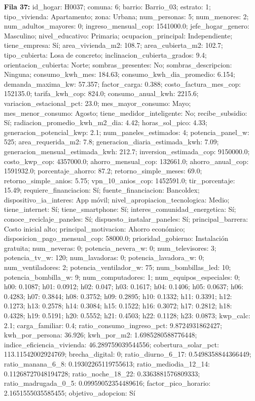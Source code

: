 {\footnotesize\textbf{Fila 37:} id\_hogar: H0037; comuna: 6; barrio: Barrio\_03; estrato: 1; tipo\_vivienda: Apartamento; zona: Urbana; num\_personas: 5; num\_menores: 2; num\_adultos\_mayores: 0; ingreso\_mensual\_cop: 1541000.0; jefe\_hogar\_genero: Masculino; nivel\_educativo: Primaria; ocupacion\_principal: Independiente; tiene\_empresa: Sí; area\_vivienda\_m2: 108.7; area\_cubierta\_m2: 102.7; tipo\_cubierta: Losa de concreto; inclinacion\_cubierta\_grados: 9.4; orientacion\_cubierta: Norte; sombras\_presentes: No; sombras\_descripcion: Ninguna; consumo\_kwh\_mes: 184.63; consumo\_kwh\_dia\_promedio: 6.154; demanda\_maxima\_kw: 57.357; factor\_carga: 0.388; costo\_factura\_mes\_cop: 152135.0; tarifa\_kwh\_cop: 824.0; consumo\_anual\_kwh: 2215.6; variacion\_estacional\_pct: 23.0; mes\_mayor\_consumo: Mayo; mes\_menor\_consumo: Agosto; tiene\_medidor\_inteligente: No; recibe\_subsidio: Sí; radiacion\_promedio\_kwh\_m2\_dia: 4.42; horas\_sol\_pico: 4.33; generacion\_potencial\_kwp: 2.1; num\_paneles\_estimados: 4; potencia\_panel\_w: 525; area\_requerida\_m2: 7.8; generacion\_diaria\_estimada\_kwh: 7.09; generacion\_mensual\_estimada\_kwh: 212.7; inversion\_estimada\_cop: 9150000.0; costo\_kwp\_cop: 4357000.0; ahorro\_mensual\_cop: 132661.0; ahorro\_anual\_cop: 1591932.0; porcentaje\_ahorro: 87.2; retorno\_simple\_meses: 69.0; retorno\_simple\_anios: 5.75; vpn\_10\_anios\_cop: 1452591.0; tir\_porcentaje: 15.49; requiere\_financiacion: Sí; fuente\_financiacion: Bancoldex; dispositivo\_ia\_interes: App móvil; nivel\_apropiacion\_tecnologica: Medio; tiene\_internet: Sí; tiene\_smartphone: Sí; interes\_comunidad\_energetica: Sí; conoce\_reciclaje\_paneles: Sí; dispuesto\_instalar\_paneles: Sí; principal\_barrera: Costo inicial alto; principal\_motivacion: Ahorro económico; disposicion\_pago\_mensual\_cop: 58000.0; prioridad\_gobierno: Instalación gratuita; num\_neveras: 0; potencia\_nevera\_w: 0; num\_televisores: 3; potencia\_tv\_w: 120; num\_lavadoras: 0; potencia\_lavadora\_w: 0; num\_ventiladores: 2; potencia\_ventilador\_w: 75; num\_bombillas\_led: 10; potencia\_bombilla\_w: 9; num\_computadores: 1; num\_equipos\_especiales: 0; h00: 0.1087; h01: 0.0912; h02: 0.047; h03: 0.1617; h04: 0.1406; h05: 0.0637; h06: 0.4283; h07: 0.3844; h08: 0.3752; h09: 0.2895; h10: 0.1332; h11: 0.3391; h12: 0.1273; h13: 0.2578; h14: 0.3084; h15: 0.1522; h16: 0.3072; h17: 0.2812; h18: 0.4328; h19: 0.5191; h20: 0.5552; h21: 0.4503; h22: 0.1128; h23: 0.0873; kwp\_calc: 2.1; carga\_familiar: 0.4; ratio\_consumo\_ingreso\_pct: 9.8724931862427; kwh\_por\_persona: 36.926; kwh\_por\_m2: 1.6985280588776448; indice\_eficiencia\_vivienda: 46.289759039544556; cobertura\_solar\_pct: 113.11542002924769; brecha\_digital: 0; ratio\_diurno\_6\_17: 0.5498358844366449; ratio\_manana\_6\_8: 0.19302265119755613; ratio\_mediodia\_12\_14: 0.11268727048194728; ratio\_noche\_18\_22: 0.3363881576809333; ratio\_madrugada\_0\_5: 0.09959052354489616; factor\_pico\_horario: 2.1651555035585455; objetivo\_adopcion: Sí\par}
